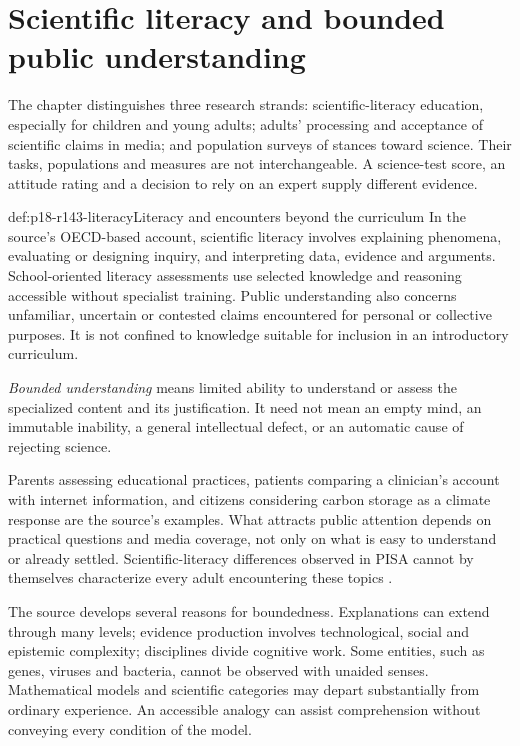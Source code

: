 \section{Scientific literacy and bounded public understanding}
\label{sec:p18-r143-boundedness}

The chapter distinguishes three research strands: scientific-literacy
education, especially for children and young adults; adults' processing
and acceptance of scientific claims in media; and population surveys of
stances toward science. Their tasks, populations and measures are not
interchangeable. A science-test score, an attitude rating and a decision
to rely on an expert supply different evidence.

\begin{hbdefinition}{def:p18-r143-literacy}{Literacy and encounters beyond the curriculum}
In the source's OECD-based account, scientific literacy involves explaining
phenomena, evaluating or designing inquiry, and interpreting data,
evidence and arguments. School-oriented literacy assessments use selected
knowledge and reasoning accessible without specialist training.
Public understanding also concerns unfamiliar, uncertain or contested
claims encountered for personal or collective purposes. It is not confined
to knowledge suitable for inclusion in an introductory curriculum.

\emph{Bounded understanding} means limited ability to understand or assess
the specialized content and its justification. It need not mean an empty
mind, an immutable inability, a general intellectual defect, or an
automatic cause of rejecting science.
\end{hbdefinition}

Parents assessing educational practices, patients comparing a clinician's
account with internet information, and citizens considering carbon storage
as a climate response are the source's examples. What attracts public
attention depends on practical questions and media coverage, not only
on what is easy to understand or already settled. Scientific-literacy
differences observed in PISA cannot by themselves characterize every
adult encountering these topics \cite[p.~768]{BrommeGierth2021PublicScience}.

The source develops several reasons for boundedness. Explanations can
extend through many levels; evidence production involves technological,
social and epistemic complexity; disciplines divide cognitive work.
Some entities, such as genes, viruses and bacteria, cannot be observed
with unaided senses. Mathematical models and scientific categories may
depart substantially from ordinary experience. An accessible analogy
can assist comprehension without conveying every condition of the model.

